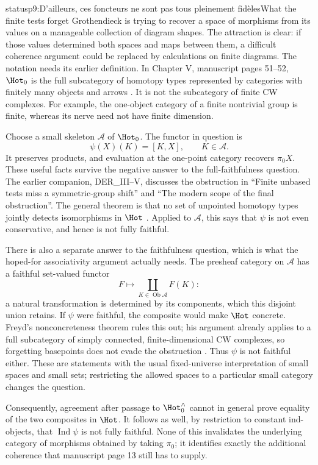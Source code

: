 \begin{dcomment}{status}{p9:D'ailleurs, ces foncteurs ne sont pas tous pleinement fidèles}{What the finite tests forget}
Grothendieck is trying to recover a space of morphisms from its values on a manageable collection of diagram shapes. The attraction is clear: if those values determined both spaces and maps between them, a difficult coherence argument could be replaced by calculations on finite diagrams. The notation needs its earlier definition. In Chapter V, manuscript pages 51--52, $\Hot_0$ is the full subcategory of homotopy types represented by categories with finitely many objects and arrows \citep[Chapter V, printed pp.~31--32]{GrothendieckDerivateursV}. It is not the subcategory of finite CW complexes. For example, the one-object category of a finite nontrivial group is finite, whereas its nerve need not have finite dimension.

Choose a small skeleton $\mathcal A$ of $\Hot_0$. The functor in question is
\[
 \psi(X)(K)=[K,X],\qquad K\in\mathcal A.
\]
It preserves products, and evaluation at the one-point category recovers $\pi_0X$. These useful facts survive the negative answer to the full-faithfulness question. The earlier companion, DER\_III--V, discusses the obstruction in ``Finite unbased tests miss a symmetric-group shift'' and ``The modern scope of the final obstruction''. The general theorem is that no set of unpointed homotopy types jointly detects isomorphisms in $\Hot$ \citep[Theorem~2.1]{ArlinChristensen2023}. Applied to $\mathcal A$, this says that $\psi$ is not even conservative, and hence is not fully faithful.

There is also a separate answer to the faithfulness question, which is what the hoped-for associativity argument actually needs. The presheaf category on $\mathcal A$ has a faithful set-valued functor
\[
 F\longmapsto\coprod_{K\in\operatorname{Ob}\mathcal A}F(K):
\]
a natural transformation is determined by its components, which this disjoint union retains. If $\psi$ were faithful, the composite would make $\Hot$ concrete. Freyd's nonconcreteness theorem rules this out; his argument already applies to a full subcategory of simply connected, finite-dimensional CW complexes, so forgetting basepoints does not evade the obstruction \citep[pp.~1 and 5 of the 2004 reprint]{Freyd1970}. Thus $\psi$ is not faithful either. These are statements with the usual fixed-universe interpretation of small spaces and small sets; restricting the allowed spaces to a particular small category changes the question.

Consequently, agreement after passage to $\Hot_0^{\wedge}$ cannot in general prove equality of the two composites in $\Hot$. It follows as well, by restriction to constant ind-objects, that $\operatorname{Ind}\psi$ is not fully faithful. None of this invalidates the underlying category of morphisms obtained by taking $\pi_0$; it identifies exactly the additional coherence that manuscript page 13 still has to supply.
\end{dcomment}

